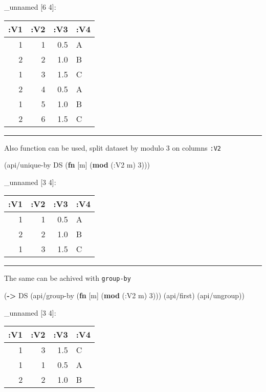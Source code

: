 \documentclass[]{article}
\newenvironment{Shaded}{\begin{snugshade}}{\end{snugshade}}
\newcommand{\KeywordTok}[1]{\textcolor[rgb]{0.13,0.29,0.53}{\textbf{#1}}}
\newcommand{\DecValTok}[1]{\textcolor[rgb]{0.00,0.00,0.81}{#1}}
\newcommand{\AttributeTok}[1]{\textcolor[rgb]{0.77,0.63,0.00}{#1}}
\newcommand{\NormalTok}[1]{#1}
\begin{document}
\_unnamed {[}6 4{]}:

\begin{longtable}[]{@{}rrrl@{}}
\toprule
:V1 & :V2 & :V3 & :V4\tabularnewline
\midrule
\endhead
1 & 1 & 0.5 & A\tabularnewline
2 & 2 & 1.0 & B\tabularnewline
1 & 3 & 1.5 & C\tabularnewline
2 & 4 & 0.5 & A\tabularnewline
1 & 5 & 1.0 & B\tabularnewline
2 & 6 & 1.5 & C\tabularnewline
\bottomrule
\end{longtable}

\begin{center}\rule{0.5\linewidth}{0.5pt}\end{center}

Also function can be used, split dataset by modulo 3 on columns
\texttt{:V2}

\begin{Shaded}
\begin{Highlighting}[]
\NormalTok{(api/unique-by DS (}\KeywordTok{fn}\NormalTok{ [m] (}\KeywordTok{mod}\NormalTok{ (}\AttributeTok{:V2}\NormalTok{ m) }\DecValTok{3}\NormalTok{)))}
\end{Highlighting}
\end{Shaded}

\_unnamed {[}3 4{]}:

\begin{longtable}[]{@{}rrrl@{}}
\toprule
:V1 & :V2 & :V3 & :V4\tabularnewline
\midrule
\endhead
1 & 1 & 0.5 & A\tabularnewline
2 & 2 & 1.0 & B\tabularnewline
1 & 3 & 1.5 & C\tabularnewline
\bottomrule
\end{longtable}

\begin{center}\rule{0.5\linewidth}{0.5pt}\end{center}

The same can be achived with \texttt{group-by}

\begin{Shaded}
\begin{Highlighting}[]
\NormalTok{(}\KeywordTok{->}\NormalTok{ DS}
\NormalTok{    (api/group-by (}\KeywordTok{fn}\NormalTok{ [m] (}\KeywordTok{mod}\NormalTok{ (}\AttributeTok{:V2}\NormalTok{ m) }\DecValTok{3}\NormalTok{)))}
\NormalTok{    (api/first)}
\NormalTok{    (api/ungroup))}
\end{Highlighting}
\end{Shaded}

\_unnamed {[}3 4{]}:

\begin{longtable}[]{@{}rrrl@{}}
\toprule
:V1 & :V2 & :V3 & :V4\tabularnewline
\midrule
\endhead
1 & 3 & 1.5 & C\tabularnewline
1 & 1 & 0.5 & A\tabularnewline
2 & 2 & 1.0 & B\tabularnewline
\bottomrule
\end{longtable}
\end{document}
